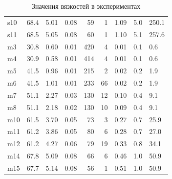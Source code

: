 \documentclass[a4paper, 12pt]{article}
\begin{document}
\begin{table}
\begin{center}
\begin{tabular}{|l|l|rr|rr|lll|}
            s10 & 68.4           & 5.01        & 0.08              & 59             & 1                    & 1.09 & 5.0        & 250.1         \\
            s11 & 68.5           & 5.05        & 0.08              & 60             & 1                    & 1.10 & 5.1         & 257.6         \\\hline
            m3  & 30.8           & 0.60        & 0.01              & 420            & 4                    & 0.01 & 0.1         & 0.6      \\
            m4  & 30.9           & 0.58        & 0.01              & 414            & 4                    & 0.01 & 0.1         & 0.6       \\
            m5  & 41.5           & 0.96        & 0.01               & 215            & 2                    & 0.02 & 0.2         & 1.9        \\
            m6  & 41.5           & 1.01        & 0.01               & 233            & 66                   & 0.02 & 0.2        & 1.9        \\
            m7  & 51.1           & 2.27        & 0.03              & 130            & 12                   & 0.10 & 0.4         & 9.1        \\
            m8  & 51.1           & 2.18        & 0.02              & 130            & 10                   & 0.09 & 0.4         & 9.1        \\
            m10 & 61.5           & 3.70        & 0.05              & 73             & 3                    & 0.27 & 0.7         & 25.9         \\
            m11 & 61.2           & 3.86        & 0.05              & 80             & 6                    & 0.28 & 0.7         & 27.0        \\
            m12 & 61.2           & 4.27        & 0.06               & 79             & 19                   & 0.33 & 0.8         & 34.1         \\
            m14 & 67.8           & 5.09        & 0.08              & 66             & 6                    & 0.46 & 1.0         & 50.9       \\
            m15 & 67.7           & 5.14        & 0.08               & 56             & 1                    & 0.51 & 1.0         & 50.9         \\
            \hline
        \end{tabular}
    \end{center}

    \caption{Значения вязкостей в экспериментах}
    \label{data}
\end{table}
\end{document}
